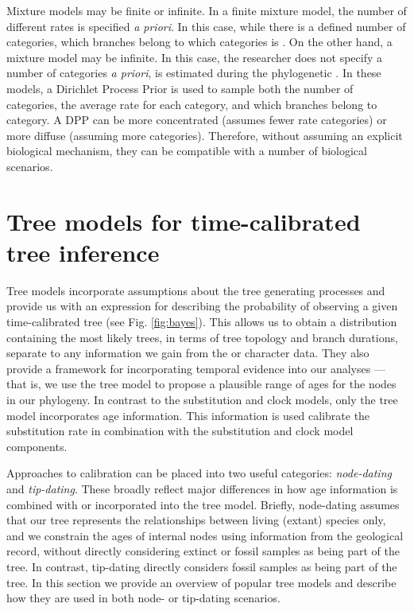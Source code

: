 Mixture models may be finite or infinite.
In a finite mixture model, the number of different rates is specified \textit{a priori}. 
In this case, while there is a defined number of categories, which branches belong to which categories is .
On the other hand, a mixture model may be infinite.
In this case, the researcher does not specify a number of categories \textit{a priori},  is estimated during the phylogenetic  \citep{Heath2012a}.
In these models, a Dirichlet Process Prior  is used to sample both the number of categories, the average rate for each category, and which branches belong to  category.
A DPP can be more concentrated (assumes fewer rate categories) or more diffuse (assuming more categories).
Therefore, without assuming an explicit biological mechanism, they can be compatible with a number of biological scenarios. 

\section{Tree models for time-calibrated tree inference}


Tree models incorporate assumptions about the tree generating processes and provide us with an expression for describing the probability of observing a given time-calibrated tree (see Fig. \ref{fig:bayes}). This allows us to obtain a distribution containing the most likely trees, in terms of tree topology and branch durations, separate to any information we gain from the  or character data.
They also provide a framework for incorporating temporal evidence into our analyses --- that is, we use the tree model to propose a plausible range of ages for the nodes in our phylogeny.
In contrast to the substitution and clock models, only the tree model incorporates age information. %
This information is used  calibrate the substitution rate in combination with the substitution and clock model components.

Approaches to calibration can be placed into two useful categories: \textit{node-dating} and \textit{tip-dating}. 
These broadly reflect major differences in how age information is combined with or incorporated into the tree model.
Briefly, node-dating assumes that our tree represents the relationships between living (extant) species only, and we constrain the ages of internal nodes using information from the geological record, without directly considering extinct or fossil samples as being part of the tree.
In contrast, tip-dating directly considers fossil samples as being part of the tree.
In this section we provide an overview of popular tree models and describe how they are used in both node- or tip-dating scenarios.

